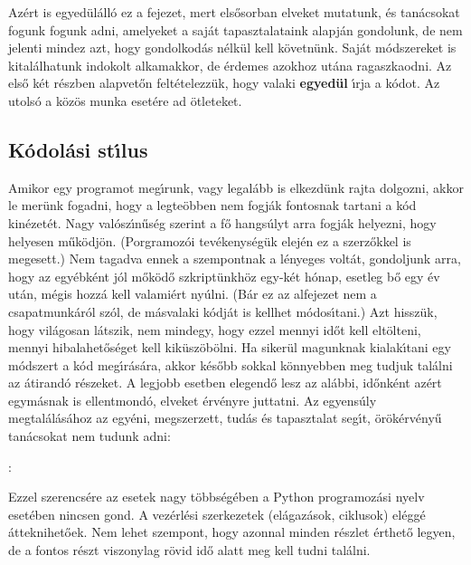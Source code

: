 Az\'ert is egyed\"ul\'all\'o ez a fejezet, mert els\H{o}sorban elveket mutatunk, \'es tan\'acsokat fogunk 
fogunk adni, amelyeket a saj\'at tapasztalataink alapj\'an gondolunk, de nem jelenti mindez azt, hogy 
gondolkod\'as n\'elk\"ul kell k\"ovetn\"unk. Saj\'at m\'odszereket is kital\'alhatunk indokolt alkamakkor, 
de \'erdemes azokhoz ut\'ana ragaszkaodni. Az els\H{o} k\'et r\'eszben alapvet\H{o}n felt\'etelezz\"uk, hogy 
valaki {\bf egyed\"ul} \'{\i}rja a k\'odot. Az utols\'o a k\"oz\"os munka eset\'ere ad \"otleteket.

\subsection{K\'odol\'asi st\'{\i}lus}

Amikor egy programot meg\'{\i}runk, vagy legal\'abb is elkezd\"unk rajta dolgozni, akkor le mer\"unk fogadni, 
hogy a legte\"obben nem fogj\'ak fontosnak tartani a k\'od kin\'ezet\'et. Nagy val\'osz\'{\i}n\H{u}s\'eg szerint 
a f\H{o} hangs\'ulyt arra fogj\'ak helyezni, hogy helyesen m\H{u}k\"odj\"on. (Porgramoz\'oi tev\'ekenys\'eg\"uk 
elej\'en ez a szerz\H{o}kkel is megesett.) Nem tagadva ennek a szempontnak a l\'enyeges volt\'at, gondoljunk 
arra, hogy az egy\'ebk\'ent j\'ol m\H{o}k\"od\H{o} szkript\"unkh\"oz egy-k\'et h\'onap, esetleg b\H{o} egy 
\'ev ut\'an, m\'egis hozz\'a kell valami\'ert ny\'ulni. (B\'ar ez az alfejezet nem a csapatmunk\'ar\'ol 
sz\'ol, de m\'asvalaki k\'odj\'at is kellhet m\'odos\'{\i}tani.) Azt hissz\"uk, hogy vil\'agosan l\'atszik, 
nem mindegy, hogy ezzel mennyi id\H{o}t kell elt\"olteni, mennyi hibalahet\H{o}s\'eget kell kik\"usz\"ob\"olni. 
Ha siker\"ul magunknak kialak\'{\i}tani egy m\'odszert a k\'od meg\'{\i}r\'as\'ara, akkor k\'es\H{o}bb sokkal 
k\"onnyebben meg tudjuk tal\'alni az \'atirand\'o r\'eszeket. A legjobb  esetben elegend\H{o} lesz az al\'abbi, 
id\H{o}nk\'ent az\'ert egym\'asnak is ellentmond\'o, elveket \'erv\'enyre juttatni. Az egyens\'uly megtal\'al\'as\'ahoz 
az egy\'eni, megszerzett, tud\'as \'es tapasztalat seg\'{\i}t, \"or\"ok\'erv\'eny\H{u} tan\'acsokat nem tudunk adni: 

:

Ezzel szerencs\'ere az esetek nagy t\"obbs\'eg\'eben a Python programoz\'asi nyelv eset\'eben nincsen gond. 
A vez\'erl\'esi szerkezetek (el\'agaz\'asok, ciklusok) el\'egg\'e \'atteknihet\H{o}ek. Nem lehet szempont, 
hogy azonnal minden r\'eszlet \'erthet\H{o}  legyen, de a fontos r\'eszt viszonylag r\"ovid id\H{o} alatt meg kell 
tudni tal\'alni. 

